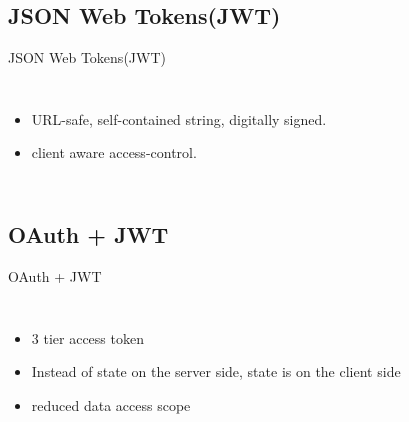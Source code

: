 \documentclass[9pt]{beamer}
\begin{document}
\subsection{JSON Web Tokens(JWT)}
\begin{frame}{JSON Web Tokens(JWT)}
  \begin{columns}
    \begin{itemize}
    \item URL-safe, self-contained string, digitally signed.
      \pause
     \item client aware access-control. 
    \end{itemize}
  \end{columns}
\end{frame}


\subsection{OAuth + JWT}
\begin{frame}{OAuth + JWT}
  \begin{columns}
    \begin{itemize}
    \item 3 tier access token
      \pause
    \item Instead of state on the server side, state is on the client side
      \pause
     \item reduced data access scope
    \end{itemize}
  \end{columns}
\end{frame}
\end{document}
